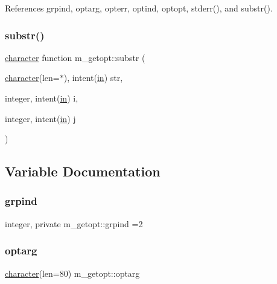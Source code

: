 References grpind, optarg, opterr, optind, optopt, stderr(), and substr().

\mbox{\label{namespacem__getopt_a20145e0f477d81541fbe9b408f2194d0}} 
\subsubsection{\texorpdfstring{substr()}{substr()}}
{\footnotesize\ttfamily \hyperlink{option__stopwatch_83_8txt_abd4b21fbbd175834027b5224bfe97e66}{character} function m\+\_\+getopt\+::substr (\begin{DoxyParamCaption}\item[{\hyperlink{option__stopwatch_83_8txt_abd4b21fbbd175834027b5224bfe97e66}{character}(len=$\ast$), intent(\hyperlink{M__journal_83_8txt_afce72651d1eed785a2132bee863b2f38}{in})}]{str,  }\item[{integer, intent(\hyperlink{M__journal_83_8txt_afce72651d1eed785a2132bee863b2f38}{in})}]{i,  }\item[{integer, intent(\hyperlink{M__journal_83_8txt_afce72651d1eed785a2132bee863b2f38}{in})}]{j }\end{DoxyParamCaption})}



\subsection{Variable Documentation}
\mbox{\label{namespacem__getopt_ae80924cbaae8d0e057ab2a0660cddee4}} 
\subsubsection{\texorpdfstring{grpind}{grpind}}
{\footnotesize\ttfamily integer, private m\+\_\+getopt\+::grpind =2\hspace{0.3cm}{\ttfamily [private]}}

\mbox{\label{namespacem__getopt_abfaa4b627673956019b3c2148e32a6fa}} 
\subsubsection{\texorpdfstring{optarg}{optarg}}
{\footnotesize\ttfamily \hyperlink{option__stopwatch_83_8txt_abd4b21fbbd175834027b5224bfe97e66}{character}(len=80) m\+\_\+getopt\+::optarg}

